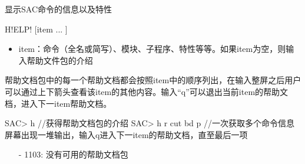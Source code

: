 \label{cmd:help}

显示SAC命令的信息以及特性

\begin{SACSTX}
H!ELP! [item ... ]
\end{SACSTX}

\begin{itemize}
\item item：命令（全名或简写）、模块、子程序、特性等等。如果item为空，则输入帮助文件包的介绍
\end{itemize}

帮助文档包中的每一个帮助文档都会按照item中的顺序列出，在输入整屏之后用户可以通过上下箭头查看该item的其他内容。输入``q''可以退出当前item的帮助文档，进入下一item帮助文档。

\begin{SACCode}
SAC> h                  //获得帮助文档包的介绍
SAC> h r cut bd p       //一次获取多个命令信息
屏幕出现一堆输出，输入q进入下一item的帮助文档，直至最后一项
\end{SACCode}

\begin{itemize}
\item[-]1103: 没有可用的帮助文档包
\end{itemize}
